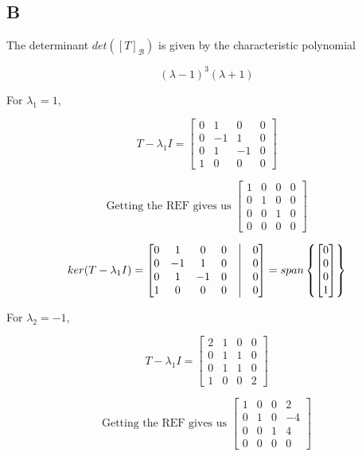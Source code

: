 \documentclass{article}
\begin{document}
\subsection*{B}
The determinant $det([T]_{\mathcal{B}})$ is given by the characteristic polynomial

\[ (\lambda - 1)^3(\lambda + 1) \]

For $\lambda_1 = 1$,

\[ T - \lambda_1 I = \begin{bmatrix} 0 & 1 & 0 & 0 \\ 0 & -1 & 1 & 0 \\ 0 & 1 & -1 & 0 \\ 1 & 0 & 0 & 0 \end{bmatrix} \]

\[ \text{Getting the REF gives us } \begin{bmatrix} 1 & 0 & 0 & 0 \\ 0 & 1 & 0 & 0 \\ 0 & 0 & 1 & 0 \\ 0 & 0 & 0 & 0 \end{bmatrix} \]

\[ ker(T - \lambda_1 I) = \begin{bmatrix} 0 & 1 & 0 & 0 &\bigm| & 0 \\ 0 & -1 & 1 & 0 &\bigm| & 0 \\ 0 & 1 & -1 & 0 &\bigm| & 0 \\ 1 & 0 & 0 & 0 &\bigm| & 0 \end{bmatrix} = span\begin{Bmatrix} \begin{bmatrix} 0 \\ 0 \\ 0 \\ 1 \end{bmatrix} \end{Bmatrix} \]

For $\lambda_2 = -1$,

\[ T - \lambda_1 I = \begin{bmatrix} 2 & 1 & 0 & 0 \\ 0 & 1 & 1 & 0 \\ 0 & 1 & 1 & 0 \\ 1 & 0 & 0 & 2 \end{bmatrix} \]

\[ \text{Getting the REF gives us } \begin{bmatrix} 1 & 0 & 0 & 2 \\ 0 & 1 & 0 & -4 \\ 0 & 0 & 1 & 4 \\ 0 & 0 & 0 & 0 \end{bmatrix} \]
\end{document}
